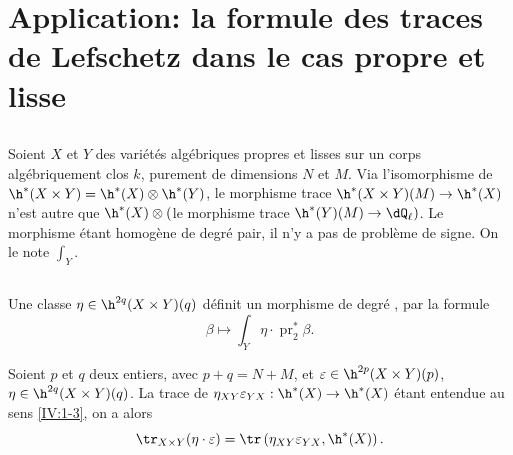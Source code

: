 \section{Application: la formule des traces de Lefschetz dans le cas propre et lisse}\label{IV:3}





\subsection{}\label{IV:3-1}

Soient $X$ et $Y$ des variétés algébriques propres et lisses sur un corps 
algébriquement clos $k$, purement de dimensions $N$ et $M$. Via 
l'isomorphisme de  
$\h^*(X\times Y)=\h^*(X)\otimes \h^*(Y)$, le morphisme trace 
$\h^*(X\times Y)(M)\to \h^*(X)$ n'est autre que 
$\h^*(X)\otimes ($le morphisme trace $\h^*(Y)(M)\to \dQ_\ell)$. Le 
morphisme étant homogène de degré pair, il n'y a pas de problème de 
signe. On le note $\int_Y$. 





\subsection{}\label{IV:3-2}

Une classe $\eta\in \h^{2 q}(X\times Y)(q)$ définit un morphisme de degré 
, par la formule 
\[
  \beta \mapsto \int_Y \eta\cdot \operatorname{pr}_2^\ast \beta \text{.}
\]





\begin{proposition_}\label{IV:3-3}
Soient $p$ et $q$ deux entiers, avec $p+q=N+M$, et 
$\varepsilon\in \h^{2 p}(X\times Y)(p)$, $\eta\in \h^{2 q}(X\times Y)(q)$. La 
trace de $\eta_{X Y}\varepsilon_{Y X}:\h^*(X)\to \h^*(X)$ étant 
entendue au sens \ref{IV:1-3}, on a alors 
\[
  \tr_{X\times Y}(\eta\cdot \varepsilon) = \tr\left(\eta_{X Y}\varepsilon_{Y X},\h^*(X)\right) \text{.}
\]
\end{proposition_}

